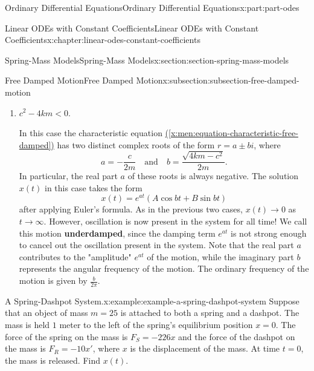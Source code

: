 \documentclass[twoside,10pt,]{book}
\newcommand{\xreffont}{\relax}
\newcommand{\terminology}[1]{\textbf{#1}}
\numberwithin{equation}{part}
\newcommand{\lt}{<}
\begin{document}
\begin{partptx}{Ordinary Differential Equations}{}{Ordinary Differential Equations}{}{}{x:part:part-odes}
\begin{chapterptx}{Linear ODEs with Constant Coefficients}{}{Linear ODEs with Constant Coefficients}{}{}{x:chapter:linear-odes-constant-coefficients}
\begin{sectionptx}{Spring-Mass Models}{}{Spring-Mass Models}{}{}{x:section:section-spring-mass-models}
\begin{subsectionptx}{Free Damped Motion}{}{Free Damped Motion}{}{}{x:subsection:subsection-free-damped-motion}
\begin{enumerate}[label=\arabic*:]
In this case, the characteristic equation \hyperref[x:men:equation-characteristic-free-damped]{({\xreffont\ref{x:men:equation-characteristic-free-damped}})} has a repeated (real) root, and so the solution \(x(t)\) takes the form%
\begin{equation*}
x(t) = e^{r_{1}t}(c_{1} + c_{2}t).
\end{equation*}
This mass can pass through \(x = 0\) only once, at \(t = -\frac{c_{1}}{c_{2}}\). Once it does, the mass will "turn around" soon afterwards and beginning moving back to \(0\), as in the first case. We call this type of motion \terminology{critically damped}, since it's right on the border between overdamped motion and oscillating motion.%
\item{}\(c^{2} - 4km \lt 0\).%
\par
In this case the characteristic equation \hyperref[x:men:equation-characteristic-free-damped]{({\xreffont\ref{x:men:equation-characteristic-free-damped}})} has two distinct complex roots of the form \(r = a \pm bi\), where%
\begin{equation*}
a = -\frac{c}{2m}\quad\text{and}\quad b = \frac{\sqrt{4km - c^{2}}}{2m}.
\end{equation*}
In particular, the real part \(a\) of these roots is always negative. The solution \(x(t)\) in this case takes the form%
\begin{equation*}
x(t) = e^{at}(A\cos bt + B\sin bt)
\end{equation*}
after applying Euler's formula. As in the previous two cases, \(x(t)\to0\) as \(t\to\infty\). However, oscillation is now present in the system for all time! We call this motion \terminology{underdamped}, since the damping term \(e^{at}\) is not strong enough to cancel out the oscillation present in the system. Note that the real part \(a\) contributes to the "amplitude" \(e^{at}\) of the motion, while the imaginary part \(b\) represents the angular frequency of the motion. The ordinary frequency of the motion is given by \(\frac{b}{2\pi}\).%
\end{enumerate}
\begin{example}{A Spring-Dashpot System.}{x:example:example-a-spring-dashpot-system}%
Suppose that an object of mass \(m = 25\) is attached to both a spring and a dashpot. The mass is held \(1\) meter to the left of the spring's equilibrium position \(x = 0\). The force of the spring on the mass is \(F_{S} = -226x\) and the force of the dashpot on the mass is \(F_{R} = -10x'\), where \(x\) is the displacement of the mass. At time \(t = 0\), the mass is released. Find \(x(t)\).%

\end{example}
\end{subsectionptx}
\end{sectionptx}
\end{chapterptx}
\end{partptx}
\end{document}
